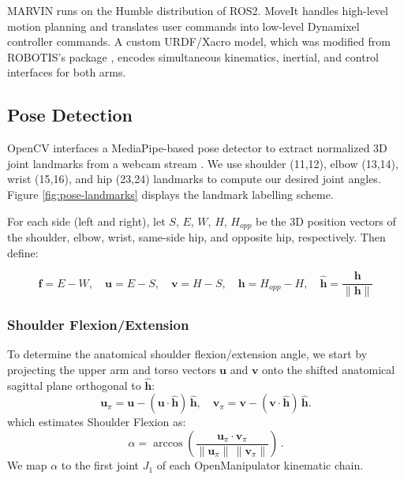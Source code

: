 \documentclass[acmsmall, screen]{acmart}
\begin{document}
MARVIN runs on the Humble distribution of ROS2. MoveIt handles high-level motion planning and translates user commands into low-level Dynamixel controller commands. A custom URDF/Xacro model, which was modified from ROBOTIS's package \cite{OpenManipulator2025}, encodes simultaneous kinematics, inertial, and control interfaces for both arms.

\subsection{Pose Detection}
OpenCV interfaces a MediaPipe-based pose detector to extract normalized 3D joint landmarks from a webcam stream \cite{noauthor_mediapipe_nodate}. We use shoulder (11,12), elbow (13,14), wrist (15,16), and hip (23,24) landmarks to compute our desired joint angles. Figure \ref{fig:pose-landmarks} displays the landmark labelling scheme.

For each side (left and right), let $S$, $E$, $W$, $H$, $H_{opp}$ be the 3D position vectors of the shoulder, elbow, wrist, same-side hip, and opposite hip, respectively. Then define:

\begin{equation}
  \mathbf{f}=E-W,\quad \mathbf{u}=E-S,\quad \mathbf{v}=H-S,\quad \mathbf{h}=H_{opp}-H,\quad \hat{\mathbf{h}}=\frac{\mathbf{h}}{\lVert\mathbf{h}\rVert}
\end{equation}

\subsubsection{Shoulder Flexion/Extension}
To determine the anatomical shoulder flexion/extension angle, we start by projecting the upper arm and torso vectors $\mathbf{u}$ and $\mathbf{v}$ onto the shifted anatomical sagittal plane orthogonal to $\hat{\mathbf{h}}$:
\begin{equation}
\mathbf{u}_\pi=\mathbf{u}-(\mathbf{u}\cdot\hat{\mathbf{h}})\,\hat{\mathbf{h}},\quad
\mathbf{v}_\pi=\mathbf{v}-(\mathbf{v}\cdot\hat{\mathbf{h}})\,\hat{\mathbf{h}}.
\end{equation}
which estimates Shoulder Flexion as:
\begin{equation}
\alpha=\arccos \!\left( \frac{\mathbf{u}_\pi \cdot \mathbf{v}_\pi}{\lVert\mathbf{u}_\pi\rVert\, \lVert\mathbf{v}_\pi\rVert} \right)\,.
\end{equation}
We map $\alpha$ to the first joint $J_1$ of each OpenManipulator kinematic chain.
\end{document}
